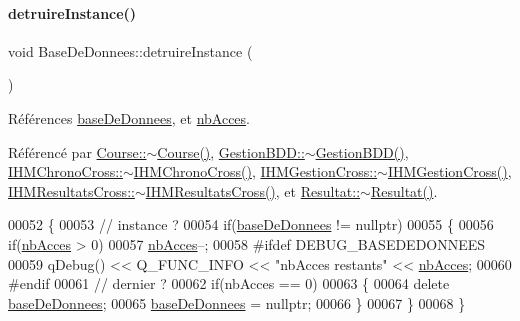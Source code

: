 \paragraph{\texorpdfstring{detruire\+Instance()}{detruireInstance()}}
{\footnotesize\ttfamily void Base\+De\+Donnees\+::detruire\+Instance (\begin{DoxyParamCaption}{ }\end{DoxyParamCaption})\hspace{0.3cm}{\ttfamily [static]}}



Références \hyperlink{class_base_de_donnees_a822ba0b7cf85b1e48ced8efd3d65e266}{base\+De\+Donnees}, et \hyperlink{class_base_de_donnees_a5099ecb2922bb31d84cd5d4505298a29}{nb\+Acces}.



Référencé par \hyperlink{class_course_aa9038f2e129526920037dda9e76d69d0}{Course\+::$\sim$\+Course()}, \hyperlink{class_gestion_b_d_d_a4d98c4008182a5749c57c97772b3c303}{Gestion\+B\+D\+D\+::$\sim$\+Gestion\+B\+D\+D()}, \hyperlink{class_i_h_m_chrono_cross_a312f21e1d150096b3f36ba36476907eb}{I\+H\+M\+Chrono\+Cross\+::$\sim$\+I\+H\+M\+Chrono\+Cross()}, \hyperlink{class_i_h_m_gestion_cross_a47cc1d5e80bea3d5e3396a8c16158c45}{I\+H\+M\+Gestion\+Cross\+::$\sim$\+I\+H\+M\+Gestion\+Cross()}, \hyperlink{class_i_h_m_resultats_cross_a62afe926862fddcb340e4a2c57c3cddf}{I\+H\+M\+Resultats\+Cross\+::$\sim$\+I\+H\+M\+Resultats\+Cross()}, et \hyperlink{class_resultat_ae159333a3c5b89b8f307086bac618d7c}{Resultat\+::$\sim$\+Resultat()}.


\begin{DoxyCode}
00052 \{
00053     \textcolor{comment}{// instance ?}
00054     \textcolor{keywordflow}{if}(\hyperlink{class_base_de_donnees_a822ba0b7cf85b1e48ced8efd3d65e266}{baseDeDonnees} != \textcolor{keyword}{nullptr})
00055     \{
00056         \textcolor{keywordflow}{if}(\hyperlink{class_base_de_donnees_a5099ecb2922bb31d84cd5d4505298a29}{nbAcces} > 0)
00057             \hyperlink{class_base_de_donnees_a5099ecb2922bb31d84cd5d4505298a29}{nbAcces}--;
00058 \textcolor{preprocessor}{        #ifdef DEBUG\_BASEDEDONNEES}
00059         qDebug() << Q\_FUNC\_INFO << \textcolor{stringliteral}{"nbAcces restants"} << \hyperlink{class_base_de_donnees_a5099ecb2922bb31d84cd5d4505298a29}{nbAcces};
00060 \textcolor{preprocessor}{        #endif}
00061         \textcolor{comment}{// dernier ?}
00062         \textcolor{keywordflow}{if}(nbAcces == 0)
00063         \{
00064             \textcolor{keyword}{delete} \hyperlink{class_base_de_donnees_a822ba0b7cf85b1e48ced8efd3d65e266}{baseDeDonnees};
00065             \hyperlink{class_base_de_donnees_a822ba0b7cf85b1e48ced8efd3d65e266}{baseDeDonnees} = \textcolor{keyword}{nullptr};
00066         \}
00067     \}
00068 \}
\end{DoxyCode}
\mbox{\label{class_base_de_donnees_a00388973f3ec42e5c8e76e7af7e124b2}} 
